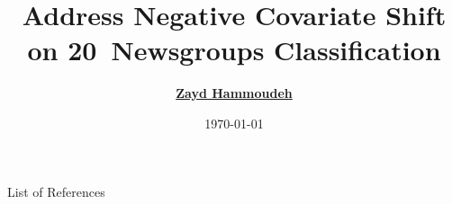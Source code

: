 \documentclass[11pt,dvipsnames,usenames,aspectratio=169]{beamer}  %
\title[Negative Covariate Shift]{Address Negative Covariate Shift \\ on 20~Newsgroups Classification}
\author[Zayd Hammoudeh]{%
  \href{mailto:zayd@cs.uoregon.edu}{\textbf{Zayd Hammoudeh}}\inst{1}  %
}
\institute[Univ.\ Oregon]{%
  \textsuperscript{1}\textbf{University of Oregon}\\
  Eugene, OR, USA\\
  \texttt{\href{mailto:zayd@cs.uoregon.edu}{zayd@cs.uoregon.edu}}
}
\date{\today}
\begin{document}
  

  \begin{frame}{List of References}
    
    
  \end{frame}
\end{document}
